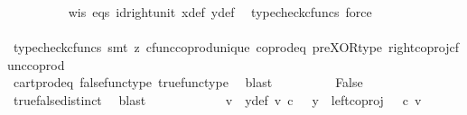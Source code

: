 \begin{isabellebody}
\ \ \ \ \ \ \ \ \isamarkupfalse%
\ w{\isacharunderscore}{\kern0pt}is\ eqs\ id{\isacharunderscore}{\kern0pt}right{\isacharunderscore}{\kern0pt}unit{}\ x{\isacharunderscore}{\kern0pt}def\ y{\isacharunderscore}{\kern0pt}def\ \isamarkupfalse%
\ {\isacharparenleft}{\kern0pt}typecheck{\isacharunderscore}{\kern0pt}cfuncs{\isacharcomma}{\kern0pt}\ force{\isacharparenright}{\kern0pt}\isanewline
\ \ \ \ \ \ \isamarkupfalse%
\ \isamarkupfalse%
\ {\isachardoublequoteopen}{\isasymlangle}{\isasymt}{\isacharcomma}{\kern0pt}{\isasymf}{\isasymrangle}\ {\isacharequal}{\kern0pt}\ {\isasymlangle}{\isasymf}{\isacharcomma}{\kern0pt}{\isasymt}{\isasymrangle}{\isachardoublequoteclose}\isanewline
\ \ \ \ \ \ \ \ \isamarkupfalse%
\ {\isacharparenleft}{\kern0pt}typecheck{\isacharunderscore}{\kern0pt}cfuncs{\isacharcomma}{\kern0pt}\ smt\ {\isacharparenleft}{\kern0pt}z{}{\isacharparenright}{\kern0pt}\ cfunc{\isacharunderscore}{\kern0pt}coprod{\isacharunderscore}{\kern0pt}unique\ coprod{\isacharunderscore}{\kern0pt}eq{}\ pre{\isacharunderscore}{\kern0pt}XOR{\isacharunderscore}{\kern0pt}type\ right{\isacharunderscore}{\kern0pt}coproj{\isacharunderscore}{\kern0pt}cfunc{\isacharunderscore}{\kern0pt}coprod{\isacharparenright}{\kern0pt}\ \ \ \ \ \ \isanewline
\ \ \ \ \ \ \isamarkupfalse%
\ \isamarkupfalse%
\ {\isachardoublequoteopen}{\isasymt}\ {\isacharequal}{\kern0pt}\ {\isasymf}\ {\isasymand}\ {\isasymf}\ {\isacharequal}{\kern0pt}\ {\isasymt}{\isachardoublequoteclose}\isanewline
\ \ \ \ \ \ \ \ \isamarkupfalse%
\ cart{\isacharunderscore}{\kern0pt}prod{\isacharunderscore}{\kern0pt}eq{}\ false{\isacharunderscore}{\kern0pt}func{\isacharunderscore}{\kern0pt}type\ true{\isacharunderscore}{\kern0pt}func{\isacharunderscore}{\kern0pt}type\ \isamarkupfalse%
\ blast\isanewline
\ \ \ \ \ \ \isamarkupfalse%
\ \isamarkupfalse%
\ False\isanewline
\ \ \ \ \ \ \ \ \isamarkupfalse%
\ true{\isacharunderscore}{\kern0pt}false{\isacharunderscore}{\kern0pt}distinct\ \isamarkupfalse%
\ blast\isanewline
\ \ \ \ \isamarkupfalse%
\isanewline
\ \ \ \ \isamarkupfalse%
\ \isamarkupfalse%
\ v\ \ y{\isacharunderscore}{\kern0pt}def{\isacharcolon}{\kern0pt}\ {\isachardoublequoteopen}v\ {\isasymin}\isactrlsub c\ {\isasymone}\ {\isasymand}\ y\ {\isacharequal}{\kern0pt}\ left{\isacharunderscore}{\kern0pt}coproj\ {\isasymone}\ {\isasymone}\ {\isasymcirc}\isactrlsub c\ v{\isachardoublequoteclose}\isanewline

\end{isabellebody}
